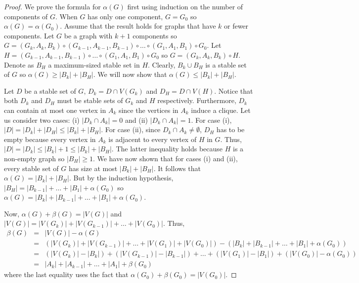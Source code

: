 \documentclass[10pt,a4paper]{amsart}
\begin{document}
\begin{proof}
We prove the formula for $\alpha(G)$ first using induction on the number of components of $G$.   When $G$ has only one component, $G = G_0$ so $\alpha(G) = \alpha(G_0)$.   Assume that the result holds for graphs that have $k$ or fewer components.  Let $G$ be a graph with $k+1$ components so $G= (G_k , A_k, B_k) \circ (G_{k-1}, A_{k-1}, B_{k-1})  \circ \hdots \circ (G_1, A_1, B_1) \circ G_0$. Let $H = (G_{k-1}, A_{k-1}, B_{k-1})  \circ \hdots \circ (G_1, A_1, B_1) \circ G_0$ so $G = (G_k, A_k, B_k) \circ H$.   Denote as $B_H$   a maximum-sized stable set in $H$.  Clearly, $B_k \cup B_H$ is a stable set of $G$ so $\alpha(G) \ge |B_k| + |B_H|$.  We will now show that $\alpha(G) \leq |B_k| + |B_H|$.

 Let $D$ be a stable set of $G$,  $D_k = D \cap V(G_k)$ and $D_H = D \cap V(H)$.  Notice that both $D_k$ and $D_H$ must be stable sets of $G_k$ and $H$ respectively.  Furthermore,  $D_k$ can contain at most one vertex in $A_k$ since the vertices in $A_k$ induce a clique.  Let us consider two cases:  (i) $|D_k \cap A_k| = 0$ and (ii) $|D_k \cap A_k| = 1$.  For case (i),  $|D| = |D_k| + |D_H| \leq |B_k| + |B_H|$.    For case (ii), since $D_k \cap A_k \neq \emptyset$,  $D_H$ has to be empty because  every vertex in $A_k$ is adjacent to every vertex of $H$ in $G$.  Thus,  $|D| = |D_k|  \leq |B_k| + 1  \leq |B_k| + |B_H|$.  The latter inequality holds because $H$ is a non-empty graph so $|B_H| \ge 1$.  We have now shown that for cases (i) and (ii), every stable set of $G$ has size at most $|B_k| + |B_H|$.  It follows that $\alpha(G) = |B_k| + |B_H|$.  But by the induction hypothesis, $|B_H| = |B_{k-1}|+ \hdots + |B_1| + \alpha(G_0)$ so $\alpha(G) = |B_k| + |B_{k-1}|+ \hdots + |B_1| + \alpha(G_0)$. 
 
 Now, $\alpha(G) + \beta(G) = |V(G)|$ and $|V(G)| = |V(G_k)| + |V(G_{k-1})| + \hdots +  |V(G_0)|$.   Thus, 
 \begin{eqnarray*}
 \beta(G) & = &  |V(G)| - \alpha(G) \\
                & = & (|V(G_k)| + |V(G_{k-1})| + \hdots + |V(G_1)| + |V(G_0)|) - (|B_k| + |B_{k-1}|+ \hdots + |B_1| + \alpha(G_0)) \\
                & = & (|V(G_k)| - |B_k|) + (|V(G_{k-1})| - |B_{k-1}|) +  \hdots + (|V(G_1)| - |B_1|) + (|V(G_0)| - \alpha(G_0)) \\
                & = &  |A_k| + |A_{k-1}| + \hdots + |A_1| + \beta(G_0)
 \end{eqnarray*}
 where the last equality uses the fact that $\alpha(G_0) + \beta(G_0) = |V(G_0)|$.
\end{proof}
\end{document}
